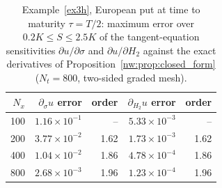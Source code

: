 \begin{table}[htbp]
\centering
\small
\caption{Example~\ref{ex3h}, European put at time to maturity $\tau=T/2$: maximum error over $0.2K\le S\le2.5K$ of the tangent-equation sensitivities $\partial u/\partial\sigma$ and $\partial u/\partial H_2$ against the exact derivatives of Proposition~\ref{nw:prop:closed_form} ($N_t=800$, two-sided graded mesh).}
\label{tab:sensitivity}
\begin{tabular}{rrrrr}
\toprule
$N_x$ & $\partial_\sigma u$ error & order & $\partial_{H_2}u$ error & order \\
\midrule
100 & $1.16\times10^{-1}$ & -- & $5.33\times10^{-3}$ & -- \\
200 & $3.77\times10^{-2}$ & 1.62 & $1.73\times10^{-3}$ & 1.62 \\
400 & $1.04\times10^{-2}$ & 1.86 & $4.78\times10^{-4}$ & 1.86 \\
800 & $2.68\times10^{-3}$ & 1.96 & $1.23\times10^{-4}$ & 1.96 \\
\bottomrule
\end{tabular}
\end{table}
